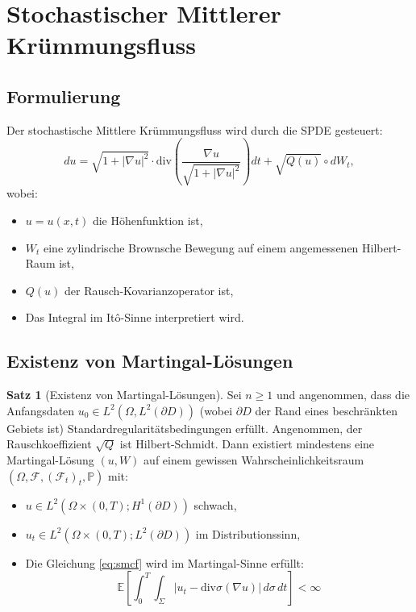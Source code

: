 \documentclass[a4paper,12pt]{article}
\theoremstyle{definition}
\newtheorem{satz}{Satz}
\begin{document}
\section{Stochastischer Mittlerer Krümmungsfluss}
\label{sec:stochastic}

\subsection{Formulierung}

Der stochastische Mittlere Krümmungsfluss wird durch die SPDE gesteuert:
\begin{equation}
\label{eq:smcf}
du = \sqrt{1 + |\nabla u|^2} \cdot \text{div}\left( \frac{\nabla u}{\sqrt{1 + |\nabla u|^2}} \right) dt + \sqrt{Q(u)} \circ dW_t,
\end{equation}
wobei:
\begin{itemize}
	\item $u = u(x, t)$ die Höhenfunktion ist,
	\item $W_t$ eine zylindrische Brownsche Bewegung auf einem angemessenen Hilbert-Raum ist,
	\item $Q(u)$ der Rausch-Kovarianzoperator ist,
	\item Das Integral im Itô-Sinne interpretiert wird.
\end{itemize}

\subsection{Existenz von Martingal-Lösungen}

\begin{satz}[Existenz von Martingal-Lösungen]
	\label{thm:existence}
	Sei $n \geq 1$ und angenommen, dass die Anfangsdaten $u_0 \in L^2(\Omega, L^2(\partial D))$ (wobei $\partial D$ der Rand eines beschränkten Gebiets ist) Standardregularitätsbedingungen erfüllt. Angenommen, der Rauschkoeffizient $\sqrt{Q}$ ist Hilbert-Schmidt. Dann existiert mindestens eine Martingal-Lösung $(u, W)$ auf einem gewissen Wahrscheinlichkeitsraum $(\Omega, \mathcal{F}, (\mathcal{F}_t)_t, \mathbb{P})$ mit:
	\begin{itemize}
		\item $u \in L^2(\Omega \times (0,T); H^1(\partial D))$ schwach,
		\item $u_t \in L^2(\Omega \times (0,T); L^2(\partial D))$ im Distributionssinn,
		\item Die Gleichung \eqref{eq:smcf} wird im Martingal-Sinne erfüllt:
		\[
		\mathbb{E}\left[\int_0^T \int_\Sigma |u_t - \text{div}\sigma(\nabla u)| \, d\sigma \, dt\right] < \infty
		\]
	\end{itemize}
\end{satz}
\end{document}
